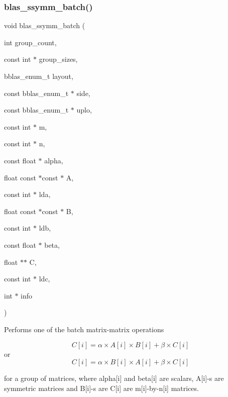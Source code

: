 \subsubsection{\texorpdfstring{blas\+\_\+ssymm\+\_\+batch()}{blas\_ssymm\_batch()}}
{\footnotesize\ttfamily void blas\+\_\+ssymm\+\_\+batch (\begin{DoxyParamCaption}\item[{int}]{group\+\_\+count,  }\item[{const int $\ast$}]{group\+\_\+sizes,  }\item[{bblas\+\_\+enum\+\_\+t}]{layout,  }\item[{const bblas\+\_\+enum\+\_\+t $\ast$}]{side,  }\item[{const bblas\+\_\+enum\+\_\+t $\ast$}]{uplo,  }\item[{const int $\ast$}]{m,  }\item[{const int $\ast$}]{n,  }\item[{const float $\ast$}]{alpha,  }\item[{float const $\ast$const $\ast$}]{A,  }\item[{const int $\ast$}]{lda,  }\item[{float const $\ast$const $\ast$}]{B,  }\item[{const int $\ast$}]{ldb,  }\item[{const float $\ast$}]{beta,  }\item[{float $\ast$$\ast$}]{C,  }\item[{const int $\ast$}]{ldc,  }\item[{int $\ast$}]{info }\end{DoxyParamCaption})}

Performs one of the batch matrix-\/matrix operations

\[ C[i] = \alpha \times A[i] \times B[i] + \beta \times C[i] \] or \[ C[i] = \alpha \times B[i] \times A[i] + \beta \times C[i] \]

for a group of matrices, where alpha\mbox{[}i\mbox{]} and beta\mbox{[}i\mbox{]} are scalars, A\mbox{[}i\mbox{]}-\/s are symmetric matrices and B\mbox{[}i\mbox{]}-\/s are C\mbox{[}i\mbox{]} are m\mbox{[}i\mbox{]}-\/by-\/n\mbox{[}i\mbox{]} matrices.


